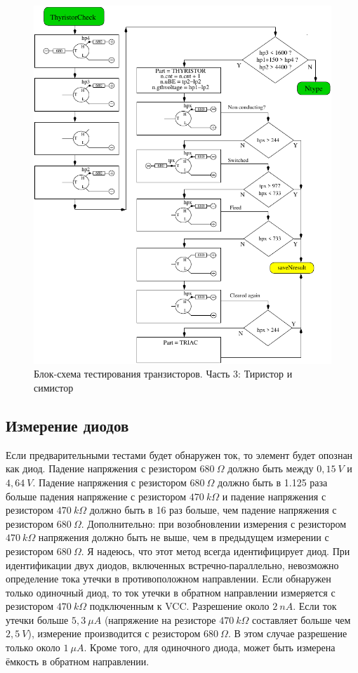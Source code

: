 \begin{figure}[H]
\centering
\includegraphics[width=.95\textwidth]{../FIG/CheckSemi3.pdf}
\caption{Блок-схема тестирования транзисторов. Часть 3: Тиристор и симистор}
\label{fig:ChkSemi3}
\end{figure}


\subsection{Измерение диодов}
\label{sec:diode}
Если предварительными тестами будет обнаружен ток, то элемент будет опознан как диод. Падение напряжения с 
резистором \(680~\Omega\) должно быть между \(0,15~V\) и \(4,64~V\). Падение   напряжения с резистором \(680~\Omega\) 
должно быть в 1.125 раза больше падения напряжение с резистором \(470~k\Omega\) и падение  напряжения с 
резистором \(470~k\Omega\) должно быть в 16 раз больше, 
чем падение  напряжения с резистором \(680~\Omega\). Дополнительно: при возобновлении измерения с 
резистором \(470~k\Omega\) напряжения должно быть не выше, чем в предыдущем измерении с 
резистором \(680~\Omega\).
Я надеюсь, что этот метод всегда идентифицирует диод. При идентификации двух диодов, включенных встречно-параллельно, 
невозможно определение тока утечки в противоположном направлении. Если обнаружен только одиночный диод, то ток 
утечки в обратном направлении измеряется с резистором \(470~k\Omega\) подключенным к VCC. Разрешение около \(2~nA\).
Если ток  утечки больше \(5,3~\mu A\) (напряжение на резисторе \(470~k\Omega\) составляет больше чем \(2,5~V\)), 
измерение производится с резистором \(680~\Omega\).
В этом случае разрешение только около \(1~\mu A\).
Кроме того, для одиночного диода, может быть измерена ёмкость в обратном направлении.

